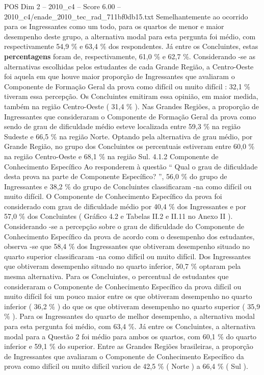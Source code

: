 \begin{textsample}{POS Dim 2 – 2010\_c4 – Score 6.00 – 2010\_c4/enade\_2010\_tec\_rad\_711bf0db15.txt}
Semelhantemente ao ocorrido para os Ingressantes como um todo, para os quartos de menor e maior desempenho deste grupo, a alternativa modal para esta pergunta foi médio, com respectivamente 54,9 \% e 63,4 \% dos respondentes.
Já entre os Concluintes, estas \textbf{percentagens} foram de, respectivamente, 61,0 \% e 62,7 \%.
Considerando -se as alternativas escolhidas pelos estudantes de cada Grande Região, a Centro-Oeste foi aquela em que houve maior proporção de Ingressantes que avaliaram o Componente de Formação Geral da prova como difícil ou muito difícil : 32,1 \% tiveram essa percepção.
Os Concluintes emitiram essa opinião, em maior medida, também na região Centro-Oeste ( 31,4 \% ).
Nas Grandes Regiões, a proporção de Ingressantes que consideraram o Componente de Formação Geral da prova como sendo de grau de dificuldade médio esteve localizada entre 59,3 \% na região Sudeste e 66,5 \% na região Norte.
Optando pela alternativa de grau médio, por Grande Região, no grupo dos Concluintes os percentuais estiveram entre 60,0 \% na região Centro-Oeste e 68,1 \% na região Sul. 4.1.2 Componente de Conhecimento Específico Ao responderem à questão “ Qual o grau de dificuldade desta prova na parte de Componente Específico? ”, 56,0 \% do grupo de Ingressantes e 38,2 \% do grupo de Concluintes classificaram -na como difícil ou muito difícil.
O Componente de Conhecimento Específico da prova foi considerado com grau de dificuldade médio por 40,4 \% dos Ingressantes e por 57,0 \% dos Concluintes ( Gráfico 4.2 e Tabelas II.2 e II.11 no Anexo II ).
Considerando -se a percepção sobre o grau de dificuldade do Componente de Conhecimento Específico da prova de acordo com o desempenho dos estudantes, observa -se que 58,4 \% dos Ingressantes que obtiveram desempenho situado no quarto superior classificaram -na como difícil ou muito difícil.
Dos Ingressantes que obtiveram desempenho situado no quarto inferior, 50,7 \% optaram pela mesma alternativa.
Para os Concluintes, o percentual de estudantes que consideraram o Componente de Conhecimento Específico da prova difícil ou muito difícil foi um pouco maior entre os que obtiveram desempenho no quarto inferior ( 36,2 \% ) do que os que obtiveram desempenho no quarto superior ( 35,9 \% ).
Para os Ingressantes do quarto de melhor desempenho, a alternativa modal para esta pergunta foi médio, com 63,4 \%.
Já entre os Concluintes, a alternativa modal para a Questão 2 foi médio para ambos os quartos, com 60,1 \% do quarto inferior e 59,1 \% do superior.
Entre as Grandes Regiões brasileiras, a proporção de Ingressantes que avaliaram o Componente de Conhecimento Específico da prova como difícil ou muito difícil variou de 42,5 \% ( Norte ) a 66,4 \% ( Sul ).

\end{textsample}
